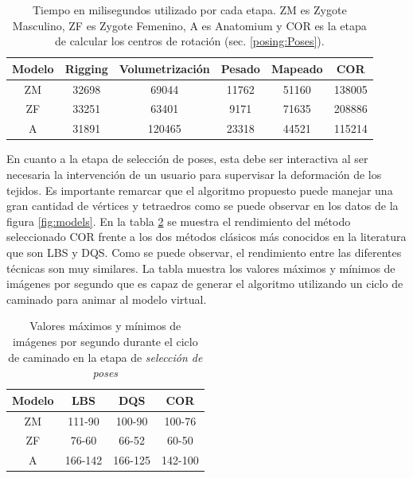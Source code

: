 \begin{table}[!h]
\centering
\caption{Tiempo en milisegundos utilizado por cada etapa. ZM es Zygote Masculino, ZF es Zygote Femenino, A es Anatomium y \ac{COR} es la etapa de calcular los centros de rotación (sec. \ref{posing:Poses}).}
\begin{tabular}{|c|c|c|c|c|c|}
\hline
\textbf{Modelo} & \textbf{Rigging} & \textbf{Volumetrización} & \textbf{Pesado} & \textbf{Mapeado} & \textbf{COR }  \\ 
\hline
ZM  & 32698 & 69044 & 11762  & 51160   & 138005 \\ 
\hline
ZF  & 33251 & 63401 & 9171  & 71635   & 208886  \\ 
\hline
A   & 31891 & 120465 & 23318 & 44521  & 115214\\ 
\hline
\end{tabular}
\label{tab:pre_pro}
\end{table}


En cuanto a la etapa de selección de poses, esta debe ser interactiva al ser necesaria la intervención de un usuario para supervisar la deformación de los tejidos. Es importante remarcar que el algoritmo propuesto puede manejar una gran cantidad de vértices y tetraedros como se puede observar en los datos de la figura \ref{fig:models}. En la tabla \ref{tab:inter} se muestra el rendimiento del método seleccionado \ac{COR} frente a los dos métodos clásicos más conocidos en la literatura que son \ac{LBS} y \ac{DQS}. Como se puede observar, el rendimiento entre las diferentes técnicas son muy similares. La tabla muestra los valores máximos y mínimos de imágenes por segundo que es capaz de generar el algoritmo utilizando un ciclo de caminado para animar al modelo virtual.
%
\begin{table}[h]
\centering
\caption{Valores máximos y mínimos de imágenes por segundo durante el ciclo de caminado en la etapa de \emph{selección de poses} }
\begin{tabular}{|c|c|c|c|}
\hline
\textbf{Modelo}&\textbf{LBS} &\textbf{DQS} &\textbf{COR} \\ 
\hline
ZM  & 111-90 & 100-90 & 100-76\\ 
\hline
ZF  & 76-60  & 66-52   & 60-50 \\ 
\hline
A   & 166-142 & 166-125 & 142-100\\ 
\hline
\end{tabular}
\label{tab:inter}
\end{table}



